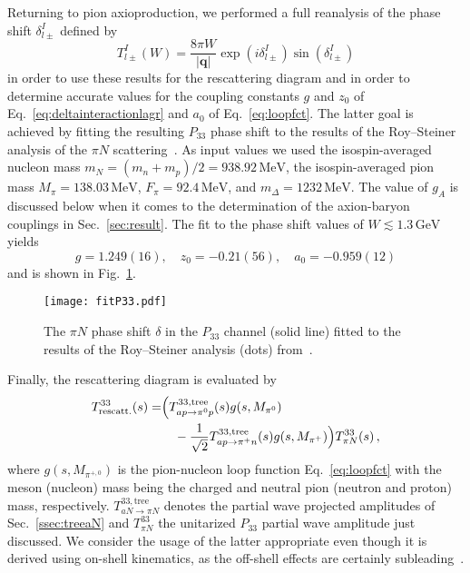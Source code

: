 \documentclass[reprint,amssymb,amsmath,floatfix,aps,prd,groupedaddress,nofootinbib]{revtex4-2}
\begin{document}
Returning to  pion axioproduction, we performed a full reanalysis of the phase shift $\delta_{l\pm}^I$ defined by
\begin{equation}
T_{l\pm}^I (W) = \frac{8\pi W}{|\mathbf{q}|}\exp(i\delta_{l\pm}^I)\sin(\delta_{l\pm}^I)
\end{equation}
in order to use these results for the rescattering diagram and in order to determine accurate values
for the coupling constants $g$ and $z_0$ of Eq.~\eqref{eq:deltainteractionlagr} and $a_0$ of Eq.~\eqref{eq:loopfct}.
The latter goal is achieved by fitting the resulting $P_{33}$ phase shift to the results of the Roy--Steiner
analysis of the $\pi N$ scattering~\cite{Hoferichter:2015hva}. As input values we used the isospin-averaged nucleon mass
$m_N = (m_n+m_p)/2 = 938.92\,\text{MeV}$, the isospin-averaged pion mass $M_\pi = 138.03\,\text{MeV}$,
$F_\pi=92.4\,\text{MeV}$, and $m_\Delta = 1232\,\text{MeV}$. The value of $g_A$ is discussed below when it
comes to the determination of the axion-baryon couplings in Sec.~\ref{sec:result}. The fit to the phase shift values
of $W\lesssim 1.3\,\text{GeV}$ yields
\begin{equation}
g = 1.249(16),\quad z_0 = -0.21(56),\quad a_0 = -0.959(12)
\end{equation}
and is shown in Fig.~\ref{fig:fitP33}.
\begin{figure}
\centering
\texttt{[image: fitP33.pdf]}
\caption{The $\pi N$ phase shift $\delta$ in the $P_{33}$ channel (solid line) fitted to the results
of the Roy--Steiner analysis (dots) from~\cite{Hoferichter:2015hva}.}
\label{fig:fitP33}
\end{figure}

Finally, the rescattering diagram is evaluated by
\begin{align}
\begin{split}\label{eq:rescatter}
T^{33}_{\rm rescatt.} (s) = & \Bigl( T^{33,\text{tree}}_{ap\to\pi^0 p} (s) g(s,M_{\pi^0}) \\ & \quad - \frac{1}{\sqrt{2}}
T^{33,\text{tree}}_{ap\to\pi^+ n}(s) g(s,M_{\pi^+}) \Bigr) T^{33}_{\pi N}(s)\,,
\end{split}
\end{align}
where $g(s,M_{\pi^{+,0}})$ is the pion-nucleon loop function Eq.~\eqref{eq:loopfct} with the meson (nucleon) mass being the
charged and neutral pion (neutron and proton) mass, respectively. $T^{33,\text{tree}}_{aN\to\pi N}$ denotes the partial wave
projected amplitudes of Sec.~\ref{ssec:treeaN} and $T^{33}_{\pi N}$ the unitarized $P_{33}$ partial wave
amplitude just discussed. We consider the usage of the latter appropriate even though it is derived
using on-shell kinematics, as the off-shell effects are certainly subleading~\cite{Mai:2012dt}.
\end{document}
